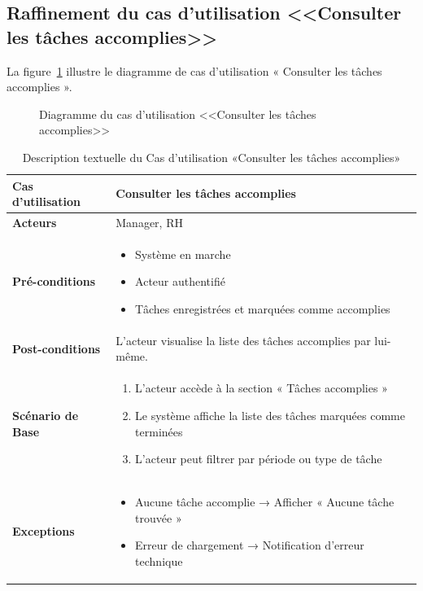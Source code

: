     \subsection{Raffinement du cas d'utilisation <<Consulter les tâches accomplies>>}
    La figure~\ref{fig:taches_accomplies} illustre le diagramme de cas d’utilisation « Consulter les tâches accomplies ».
    \begin{figure}[h]
        \centering
        \caption{Diagramme du cas d'utilisation <<Consulter les tâches accomplies>>}
        \label{fig:taches_accomplies}
    \end{figure}
\newpage
    \begin{table}[!ht]
        \vspace*{-1.2cm}
        \centering
        \caption{Description textuelle du Cas d’utilisation «Consulter les tâches accomplies»}
        \label{tab:consult_completed_tasks}
        \renewcommand{\arraystretch}{1.2}
        \begin{tabular}{|p{4.2cm}|p{11cm}|}
        \hline
        \textbf{Cas d'utilisation} & Consulter les tâches accomplies \\
        \hline
        \textbf{Acteurs} & Manager, RH \\
        \hline
        \textbf{Pré-conditions} & 
        \begin{itemize}
        \item Système en marche
        \item Acteur authentifié
        \item Tâches enregistrées et marquées comme accomplies
        \end{itemize} \\
        \hline
        \textbf{Post-conditions} & L’acteur visualise la liste des tâches accomplies par lui-même. \\
        \hline
        \textbf{Scénario de Base} & 
        \begin{enumerate}
        \item L’acteur accède à la section « Tâches accomplies »
        \item Le système affiche la liste des tâches marquées comme terminées
        \item L’acteur peut filtrer par période ou type de tâche
        \end{enumerate} \\
        \hline
        \textbf{Exceptions} & 
        \begin{itemize}
        \item Aucune tâche accomplie → Afficher « Aucune tâche trouvée »
        \item Erreur de chargement → Notification d’erreur technique
        \end{itemize} \\
        \hline
        \end{tabular}
    \end{table}
